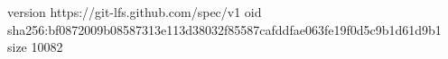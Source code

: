 version https://git-lfs.github.com/spec/v1
oid sha256:bf0872009b08587313e113d38032f85587cafddfae063fe19f0d5c9b1d61d9b1
size 10082
